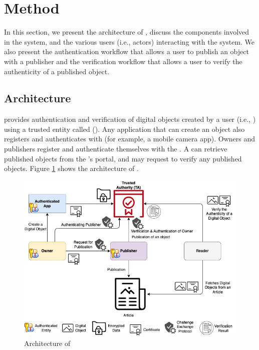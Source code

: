 \section{Method}
\label{sec:method}

In this section, we present the architecture of \name, discuss the components involved in the system, and the various users (i.e., actors) interacting with the system. We also present the authentication workflow that allows a user to publish an object with a publisher and the verification workflow that allows a user to verify the authenticity of a published object. 

\subsection{Architecture}
\label{sec:arch}

\name provides authentication and verification of digital objects created by a user (i.e., {\em \owner}) using a trusted entity called {\em \TA} (\ta). Any application that can create an object also registers and authenticates with \ta (for example, a mobile camera app). Owners and publishers register and authenticate themselves with the \ta. A \reader can retrieve published objects from the \publisher's portal, and may request \ta to verify any published objects. Figure \ref{fig:arch} shows the architecture of \name. 

\begin{figure}[htpb]
  \centering
  \includegraphics[scale=0.45]{architecture.png}
  \caption{Architecture of \name}
  \label{fig:arch}
\end{figure}

